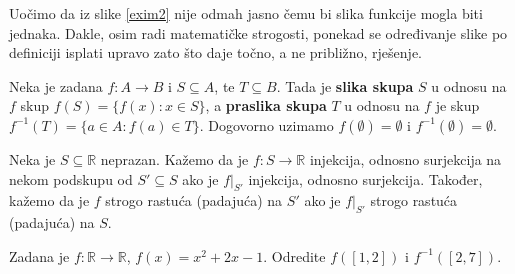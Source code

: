 \begin{remark}
Uočimo da iz slike \ref{exim2} nije odmah jasno čemu bi slika funkcije mogla biti jednaka. Dakle, osim radi matematičke strogosti, ponekad se određivanje slike po definiciji isplati upravo zato što daje točno, a ne približno, rješenje.
\end{remark}
\newpage
\begin{definition}
Neka je zadana $f : A\to B$ i $S\subseteq A$, te $T\subseteq B$. Tada je \textbf{slika skupa} $S$ u odnosu na $f$ skup $f(S)=\{f(x) : x\in S\}$, a \textbf{praslika skupa} $T$ u odnosu na $f$ je skup $f^{-1}(T)=\{a\in A : f(a)\in T\}$. Dogovorno uzimamo $f(\emptyset)=\emptyset$ i $f^{-1}(\emptyset)=\emptyset$.
\end{definition}
\begin{definition}
Neka je $S\subseteq \mathbb{R}$ neprazan. Kažemo da je $f : S\to \mathbb{R}$ injekcija, odnosno surjekcija na nekom podskupu od $S'\subseteq S$ ako je $f|_{S'}$ injekcija, odnosno surjekcija. Također, kažemo da je $f$ strogo rastuća (padajuća) na $S'$ ako je $f|_{S'}$ strogo rastuća (padajuća) na $S$.
\end{definition}
\begin{exercise}
Zadana je $f : \mathbb{R}\to \mathbb{R}$, $f(x)=x^2+2x-1$. Odredite $f\left(\left[1, 2\right]\right)$ i $f^{-1}\left(\left[2, 7\right]\right)$.
\end{exercise}
